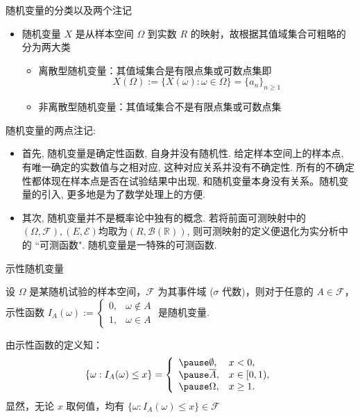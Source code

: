 \begin{frame}{随机变量的分类以及两个注记}
	\begin{itemize}[<+-|alert@+>]
		\item 随机变量 $X$ 是从样本空间 $\Omega$ 到实数 $R$ 的映射，故根据其值域集合可粗略的分为两大类
		      \begin{itemize}[<+-|alert@+>]
			      \item 离散型随机变量：其值域集合是有限点集或可数点集即
			            \[X(\Omega):=\{X(\omega):\omega\in \Omega\}=\{a_n\}_{n\geq 1}\]
			      \item 非离散型随机变量：其值域集合不是有限点集或可数点集
		      \end{itemize}
	\end{itemize}
	\pause
	\begin{rmk} 随机变量的两点注记:
		\begin{itemize}[<+-|alert@+>]
			\item 首先, 随机变量是确定性函数, 自身并没有随机性. 给定样本空间上的样本点, 有唯一确定的实数值与之相对应, 这种对应关系并没有不确定性. 所有的不确定性都体现在样本点是否在试验结果中出现, 和随机变量本身没有关系。随机变量的引入, 更多地是为了数学处理上的方便.
			\item 其次, 随机变量并不是概率论中独有的概念. 若将前面可测映射中的$(\Omega, \mathcal{F}), (E, \mathcal{E})$均取为$(R, \mathcal{B}(\mathbb{R}))$, 则可测映射的定义便退化为实分析中的 ``可测函数". 随机变量是一特殊的可测函数.
		\end{itemize}

	\end{rmk}

\end{frame}












\begin{frame}{示性随机变量}
	\begin{exam}
		设 $\Omega$ 是某随机试验的样本空间，$\mathcal{F}$ 为其事件域 ($\sigma$ 代数)，则对于任意的 $A\in \mathcal{F}$， 示性函数
		$I_A(\omega):=\left\{
			\begin{array}{ll}
				0, & \omega\notin A \\
				1, & \omega\in A
			\end{array}\right.$ 是随机变量.
	\end{exam}

	\pause
	\jieda  由示性函数的定义知：
	\begin{eqnarray*}
		\{\omega:I_A(\omega)\le x\}=\left\{
		\begin{array}{ll}
			\pause \emptyset, & x<0,        \\ \pause
			\overline{A},     & x\in [0,1), \\\pause
			\Omega,           & x\ge 1.
		\end{array}
		\right.
	\end{eqnarray*}
	\pause
	显然，无论 $x$ 取何值，均有 $\{\omega:I_A (\omega)\le x\}\in \mathcal{F}$


\end{frame}





